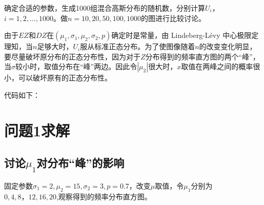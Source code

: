 \documentclass[CJK]{ctexart}
\begin{document}
确定合适的参数，生成1000组混合高斯分布的随机数，分别计算$U_i$，$i=1,2,...,1000$。做$n=10,20,50,100,1000$的图进行比较讨论。

由于$EZ$和$DZ$在$(\mu_1, \sigma_1,\mu_2,\sigma_2,p)$确定时是常量，由 Lindeberg-L\'{e}vy 中心极限定理知，当$n$足够大时，$U_i$服从标准正态分布。为了使图像随着$n$的改变变化明显，要尽量破坏原分布的正态分布性，因为对于$Z$分布得到的频率直方图的两个“峰”，当$\sigma$较小时，取值分布在“峰”两边。因此令$|\mu_2|$很大时，$x$取值在两峰之间的概率很小，可以破坏原有的正态分布性。

代码如下：



\section{问题1求解}

\subsection{讨论$\mu_1$对分布“峰”的影响}

固定参数$\sigma_1=2,\mu_2=15,\sigma_2=3,p=0.7$，改变$\mu$取值，令$\mu_1$分别为$0,4,8，12,16,20$,观察得到的频率分布直方图。
\end{document}
